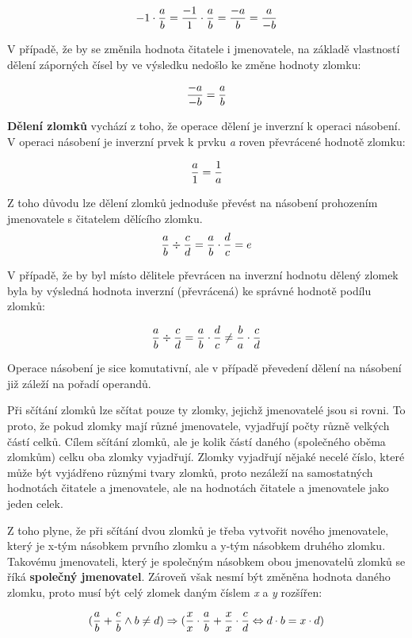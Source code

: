 $$ -1 \cdot {a \over b} = {{-1} \over 1} \cdot {a \over b} = {{-a} \over b} = {a \over {-b}} $$

V případě, že by se změnila hodnota čitatele i jmenovatele, na základě vlastností dělení záporných čísel by ve výsledku nedošlo ke změne hodnoty zlomku:

$$ {-a \over -b } = {a \over b} $$

{\bf Dělení zlomků} vychází z toho, že operace dělení je inverzní k operaci násobení. V operaci násobení je inverzní prvek k prvku {\it a} roven převrácené hodnotě zlomku:

$$ {a\over 1} = {1 \over a }$$

Z toho důvodu lze dělení zlomků jednoduše převést na násobení prohozením jmenovatele s čitatelem dělícího zlomku.
$$  {a\over b} \div {c\over d} = {a\over b} \cdot {d\over c}  = e $$

V případě, že by byl místo dělitele převrácen na inverzní hodnotu dělený zlomek byla by výsledná hodnota inverzní (převrácená) ke správné hodnotě podílu zlomků:

$$ {a\over b} \div {c\over d} = {a\over b} \cdot {d\over c} \not = {b\over a} \cdot {c\over d} $$

Operace násobení je sice komutativní, ale v případě převedení dělení na násobení již záleží na pořadí operandů.


Při sčítání zlomků lze sčítat pouze ty zlomky, jejichž jmenovatelé jsou si rovni. To proto, že pokud zlomky mají různé jmenovatele, vyjadřují počty různě velkých částí celků. Cílem sčítání zlomků, ale je kolik částí daného (společného oběma zlomkům) celku oba zlomky vyjadřují. Zlomky vyjadřují nějaké necelé číslo, které může být vyjádřeno různými tvary zlomků, proto nezáleží na samostatných hodnotách čitatele a jmenovatele, ale na hodnotách čitatele a jmenovatele jako jeden celek.

Z toho plyne, že při sčítání dvou zlomků je třeba vytvořit nového jmenovatele, který je x-tým násobkem prvního zlomku a y-tým násobkem druhého zlomku. Takovému jmenovateli, který je společným násobkem obou jmenovatelů zlomků se říká {\bf společný jmenovatel}. Zároveň však nesmí být změněna hodnota daného zlomku, proto musí být celý zlomek daným číslem {\it x} a {\it y} rozšířen:

$$ ({a \over b} + {c \over b} \wedge b \not = d) \Rightarrow ({x\over x} \cdot {a\over b} + {x\over x}\cdot {c \over d} \Leftrightarrow d\cdot b = x \cdot d)$$

